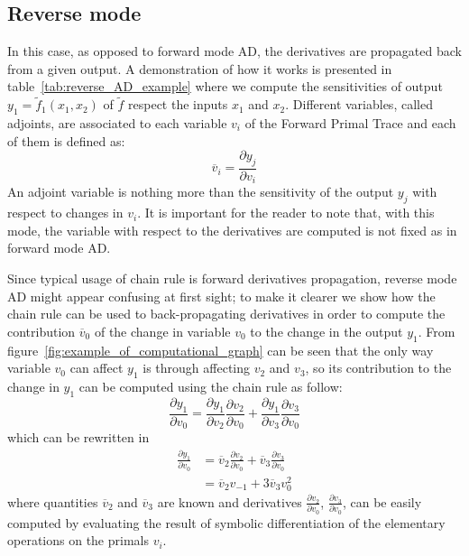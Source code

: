 
\subsection{Reverse mode}

In this case, as opposed to forward mode AD, the derivatives are propagated back from a given output. A demonstration of how it works is presented in table~\ref{tab:reverse_AD_example} where we compute the sensitivities of output $y_1 = \tilde{f}_1(x_1, x_2)$ of $\tilde{f}$ respect the inputs $x_1$ and $x_2$. Different variables, called adjoints, are associated to each variable $v_i$ of the Forward Primal Trace and each of them is defined as:
\[
\overline{v}_i = \frac{\partial y_j}{\partial v_i}
\]
An adjoint variable is nothing more than the sensitivity of the output $y_j$ with respect to changes in $v_i$. It is important for the reader to note that, with this mode, the variable with respect to the derivatives are computed is not fixed as in forward mode AD.

Since typical usage of chain rule is forward derivatives propagation, reverse mode AD might appear confusing at first sight; to make it clearer we show how the chain rule can be used to back-propagating derivatives in order to compute the contribution $\overline{v}_0$ of the change in variable $v_0$ to the change in the output $y_1$. From figure~\ref{fig:example_of_computational_graph} can be seen that the only way variable $v_0$ can affect $y_1$ is through affecting $v_2$ and $v_3$, so its contribution to the change in $y_1$ can be computed using the chain rule as follow:
\begin{equation}
	\frac{\partial y_1}{\partial v_0} = \frac{\partial y_1}{\partial v_2} \frac{\partial v_2}{\partial v_0} + \frac{\partial y_1}{\partial v_3} \frac{\partial v_3}{\partial v_0}
\end{equation}
which can be rewritten in
\begin{equation}
	\begin{split}
		\frac{\partial y_1}{\partial v_0} & = \overline{v}_2 \frac{\partial v_2}{\partial v_0} + \overline{v}_3 \frac{\partial v_3}{\partial v_0}  \\[2ex]
										  & = \overline{v}_2 v_{-1} + 3 \overline{v}_3 v_0^2
	\end{split}
\end{equation}
where quantities $\overline{v}_2$ and $\overline{v}_3$ are known and derivatives $\frac{\partial v_2}{\partial v_0}$, $\frac{\partial v_3}{\partial v_0}$, can be easily computed by evaluating the result of symbolic differentiation of the elementary operations on the primals $v_i$.

